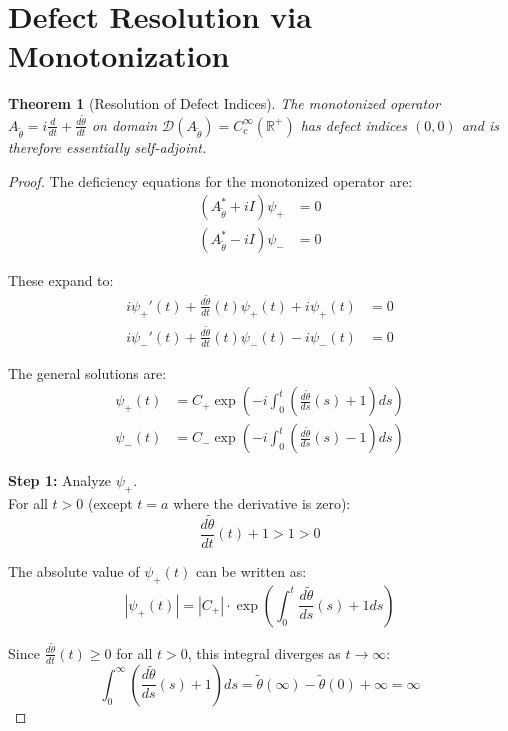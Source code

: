 \documentclass{article}
\newtheorem{theorem}{Theorem}
\theoremstyle{definition}
\begin{document}
\section{Defect Resolution via Monotonization}

\begin{theorem}[Resolution of Defect Indices]
The monotonized operator $A_{\tilde{\theta}} = i\frac{d}{dt} + \frac{d\tilde{\theta}}{dt}$ on domain $\mathcal{D}(A_{\tilde{\theta}}) = C_c^{\infty}(\mathbb{R}^+)$ has defect indices $(0,0)$ and is therefore essentially self-adjoint.
\end{theorem}

\begin{proof}
The deficiency equations for the monotonized operator are:
\begin{align}
(A_{\tilde{\theta}}^* + iI)\psi_+ &= 0\\
(A_{\tilde{\theta}}^* - iI)\psi_- &= 0
\end{align}

These expand to:
\begin{align}
i\psi_+'(t) + \frac{d\tilde{\theta}}{dt}(t)\psi_+(t) + i\psi_+(t) &= 0\\
i\psi_-'(t) + \frac{d\tilde{\theta}}{dt}(t)\psi_-(t) - i\psi_-(t) &= 0
\end{align}

The general solutions are:
\begin{align}
\psi_+(t) &= C_+ \exp\left(-i\int_0^t \left(\frac{d\tilde{\theta}}{ds}(s) + 1\right)ds\right)\\
\psi_-(t) &= C_- \exp\left(-i\int_0^t \left(\frac{d\tilde{\theta}}{ds}(s) - 1\right)ds\right)
\end{align}

\textbf{Step 1:} Analyze $\psi_+$.\\
For all $t > 0$ (except $t = a$ where the derivative is zero):
\begin{equation}
\frac{d\tilde{\theta}}{dt}(t) + 1 > 1 > 0
\end{equation}

The absolute value of $\psi_+(t)$ can be written as:
\begin{equation}
|\psi_+(t)| = |C_+| \cdot \exp\left(\int_0^t \frac{d\tilde{\theta}}{ds}(s) + 1 ds\right)
\end{equation}

Since $\frac{d\tilde{\theta}}{dt}(t) \geq 0$ for all $t > 0$, this integral diverges as $t \to \infty$:
\begin{equation}
\int_0^{\infty} \left(\frac{d\tilde{\theta}}{ds}(s) + 1\right)ds = \tilde{\theta}(\infty) - \tilde{\theta}(0) + \infty = \infty
\end{equation}


\end{proof}
\end{document}
